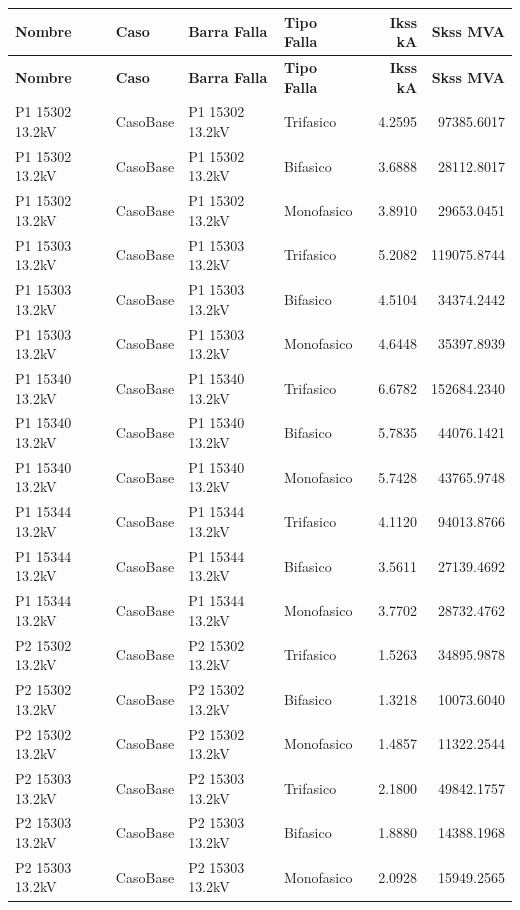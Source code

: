 \documentclass[11pt,a4paper]{article}
\begin{document}
\small
\begin{longtable}{llllrr}
\toprule
\textbf{Nombre} & \textbf{Caso} & \textbf{Barra Falla} & \textbf{Tipo Falla} & \textbf{Ikss kA} & \textbf{Skss MVA} \\
\midrule
\endfirsthead
\toprule
\textbf{Nombre} & \textbf{Caso} & \textbf{Barra Falla} & \textbf{Tipo Falla} & \textbf{Ikss kA} & \textbf{Skss MVA} \\
\midrule
\endhead
\bottomrule
\endfoot
P1 15302 13.2kV & CasoBase & P1 15302 13.2kV & Trifasico & 4.2595 & 97385.6017 \\
P1 15302 13.2kV & CasoBase & P1 15302 13.2kV & Bifasico & 3.6888 & 28112.8017 \\
P1 15302 13.2kV & CasoBase & P1 15302 13.2kV & Monofasico & 3.8910 & 29653.0451 \\
P1 15303 13.2kV & CasoBase & P1 15303 13.2kV & Trifasico & 5.2082 & 119075.8744 \\
P1 15303 13.2kV & CasoBase & P1 15303 13.2kV & Bifasico & 4.5104 & 34374.2442 \\
P1 15303 13.2kV & CasoBase & P1 15303 13.2kV & Monofasico & 4.6448 & 35397.8939 \\
P1 15340 13.2kV & CasoBase & P1 15340 13.2kV & Trifasico & 6.6782 & 152684.2340 \\
P1 15340 13.2kV & CasoBase & P1 15340 13.2kV & Bifasico & 5.7835 & 44076.1421 \\
P1 15340 13.2kV & CasoBase & P1 15340 13.2kV & Monofasico & 5.7428 & 43765.9748 \\
P1 15344 13.2kV & CasoBase & P1 15344 13.2kV & Trifasico & 4.1120 & 94013.8766 \\
P1 15344 13.2kV & CasoBase & P1 15344 13.2kV & Bifasico & 3.5611 & 27139.4692 \\
P1 15344 13.2kV & CasoBase & P1 15344 13.2kV & Monofasico & 3.7702 & 28732.4762 \\
P2 15302 13.2kV & CasoBase & P2 15302 13.2kV & Trifasico & 1.5263 & 34895.9878 \\
P2 15302 13.2kV & CasoBase & P2 15302 13.2kV & Bifasico & 1.3218 & 10073.6040 \\
P2 15302 13.2kV & CasoBase & P2 15302 13.2kV & Monofasico & 1.4857 & 11322.2544 \\
P2 15303 13.2kV & CasoBase & P2 15303 13.2kV & Trifasico & 2.1800 & 49842.1757 \\
P2 15303 13.2kV & CasoBase & P2 15303 13.2kV & Bifasico & 1.8880 & 14388.1968 \\
P2 15303 13.2kV & CasoBase & P2 15303 13.2kV & Monofasico & 2.0928 & 15949.2565 \\

\end{longtable}
\end{document}

